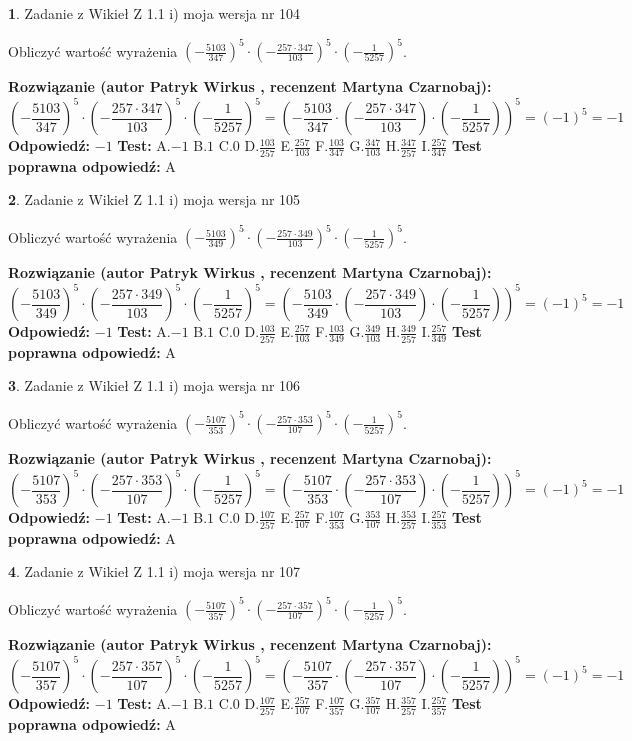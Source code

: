 \documentclass[12pt, a4paper]{article}
\theoremstyle{definition} %
\newtheorem{zad}{}
\newcommand{\zadStart}[1]{\begin{zad}#1\newline}
\newcommand{\zadStop}{\end{zad}}
\newcommand{\rozwStart}[2]{\noindent \textbf{Rozwiązanie (autor #1 , recenzent #2): }\newline}
\newcommand{\rozwStop}{\newline}
\newcommand{\odpStart}{\noindent \textbf{Odpowiedź:}\newline}
\newcommand{\odpStop}{\newline}
\newcommand{\testStart}{\noindent \textbf{Test:}\newline}
\newcommand{\testStop}{\newline}
\newcommand{\kluczStart}{\noindent \textbf{Test poprawna odpowiedź:}\newline}
\newcommand{\kluczStop}{\newline}
\begin{document}
\zadStart{Zadanie z Wikieł Z 1.1 i) moja wersja nr 104}

Obliczyć wartość wyrażenia $(-\frac{5103}{347})^{5} \cdot (-\frac{257 \cdot 347}{103})^{5} \cdot (-\frac{1}{5257})^{5}$.
\zadStop
\rozwStart{Patryk Wirkus}{Martyna Czarnobaj}
$$(-\frac{5103}{347})^{5} \cdot (-\frac{257 \cdot 347}{103})^{5} \cdot (-\frac{1}{5257})^{5} = (-\frac{5103}{347} \cdot (-\frac{257 \cdot 347}{103}) \cdot (-\frac{1}{5257}))^{5} = (-1)^{5} = -1$$
\rozwStop
\odpStart
$-1$
\odpStop
\testStart
A.$-1$ B.$1$ C.$0$ D.$\frac{103}{257}$ E.$\frac{257}{103}$
F.$\frac{103}{347}$ G.$\frac{347}{103}$
H.$\frac{347}{257}$
I.$\frac{257}{347}$
\testStop
\kluczStart
A
\kluczStop



\zadStart{Zadanie z Wikieł Z 1.1 i) moja wersja nr 105}

Obliczyć wartość wyrażenia $(-\frac{5103}{349})^{5} \cdot (-\frac{257 \cdot 349}{103})^{5} \cdot (-\frac{1}{5257})^{5}$.
\zadStop
\rozwStart{Patryk Wirkus}{Martyna Czarnobaj}
$$(-\frac{5103}{349})^{5} \cdot (-\frac{257 \cdot 349}{103})^{5} \cdot (-\frac{1}{5257})^{5} = (-\frac{5103}{349} \cdot (-\frac{257 \cdot 349}{103}) \cdot (-\frac{1}{5257}))^{5} = (-1)^{5} = -1$$
\rozwStop
\odpStart
$-1$
\odpStop
\testStart
A.$-1$ B.$1$ C.$0$ D.$\frac{103}{257}$ E.$\frac{257}{103}$
F.$\frac{103}{349}$ G.$\frac{349}{103}$
H.$\frac{349}{257}$
I.$\frac{257}{349}$
\testStop
\kluczStart
A
\kluczStop



\zadStart{Zadanie z Wikieł Z 1.1 i) moja wersja nr 106}

Obliczyć wartość wyrażenia $(-\frac{5107}{353})^{5} \cdot (-\frac{257 \cdot 353}{107})^{5} \cdot (-\frac{1}{5257})^{5}$.
\zadStop
\rozwStart{Patryk Wirkus}{Martyna Czarnobaj}
$$(-\frac{5107}{353})^{5} \cdot (-\frac{257 \cdot 353}{107})^{5} \cdot (-\frac{1}{5257})^{5} = (-\frac{5107}{353} \cdot (-\frac{257 \cdot 353}{107}) \cdot (-\frac{1}{5257}))^{5} = (-1)^{5} = -1$$
\rozwStop
\odpStart
$-1$
\odpStop
\testStart
A.$-1$ B.$1$ C.$0$ D.$\frac{107}{257}$ E.$\frac{257}{107}$
F.$\frac{107}{353}$ G.$\frac{353}{107}$
H.$\frac{353}{257}$
I.$\frac{257}{353}$
\testStop
\kluczStart
A
\kluczStop



\zadStart{Zadanie z Wikieł Z 1.1 i) moja wersja nr 107}

Obliczyć wartość wyrażenia $(-\frac{5107}{357})^{5} \cdot (-\frac{257 \cdot 357}{107})^{5} \cdot (-\frac{1}{5257})^{5}$.
\zadStop
\rozwStart{Patryk Wirkus}{Martyna Czarnobaj}
$$(-\frac{5107}{357})^{5} \cdot (-\frac{257 \cdot 357}{107})^{5} \cdot (-\frac{1}{5257})^{5} = (-\frac{5107}{357} \cdot (-\frac{257 \cdot 357}{107}) \cdot (-\frac{1}{5257}))^{5} = (-1)^{5} = -1$$
\rozwStop
\odpStart
$-1$
\odpStop
\testStart
A.$-1$ B.$1$ C.$0$ D.$\frac{107}{257}$ E.$\frac{257}{107}$
F.$\frac{107}{357}$ G.$\frac{357}{107}$
H.$\frac{357}{257}$
I.$\frac{257}{357}$
\testStop
\kluczStart
A
\kluczStop
\end{document}
